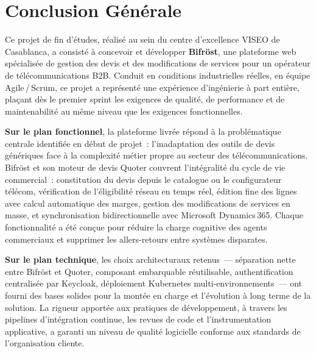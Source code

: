 
\chapter*{Conclusion G\'en\'erale}

Ce projet de fin d'\'etudes, r\'ealis\'e au sein du centre d'excellence VISEO de Casablanca, a consist\'e \`a concevoir et d\'evelopper \textbf{Bifr\"ost}, une plateforme web sp\'ecialis\'ee de gestion des devis et des modifications de services pour un op\'erateur de t\'el\'ecommunications B2B. Conduit en conditions industrielles r\'eelles, en \'equipe Agile\,/\,Scrum, ce projet a repr\'esent\'e une exp\'erience d'ing\'enierie \`a part enti\`ere, plaçant dès le premier sprint les exigences de qualit\'e, de performance et de maintenabilit\'e au m\^eme niveau que les exigences fonctionnelles.

\vspace{0.2cm}

\textbf{Sur le plan fonctionnel}, la plateforme livr\'ee r\'epond \`a la probl\'ematique centrale identifi\'ee en d\'ebut de projet~: l'inadaptation des outils de devis g\'en\'eriques face \`a la complexit\'e m\'etier propre au secteur des t\'el\'ecommunications. Bifr\"ost et son moteur de devis Quoter couvrent l'int\'egralit\'e du cycle de vie commercial~: constitution du devis depuis le catalogue ou le configurateur t\'el\'ecom, v\'erification de l'\'eligibilit\'e r\'eseau en temps r\'eel, \'edition fine des lignes avec calcul automatique des marges, gestion des modifications de services en masse, et synchronisation bidirectionnelle avec Microsoft Dynamics\,365. Chaque fonctionnalit\'e a \'et\'e con\c{c}ue pour r\'eduire la charge cognitive des agents commerciaux et supprimer les allers-retours entre syst\`emes disparates.

\vspace{0.2cm}

\textbf{Sur le plan technique}, les choix architecturaux retenus~--- s\'eparation nette entre Bifr\"ost et Quoter, composant embarquable r\'eutilisable, authentification centralis\'ee par Keycloak, d\'eploiement Kubernetes multi-environnements~--- ont fourni des bases solides pour la mont\'ee en charge et l'\'evolution \`a long terme de la solution. La rigueur apport\'ee aux pratiques de d\'eveloppement, \`a travers les pipelines d'int\'egration continue, les revues de code et l'instrumentation applicative, a garanti un niveau de qualit\'e logicielle conforme aux standards de l'organisation cliente.

